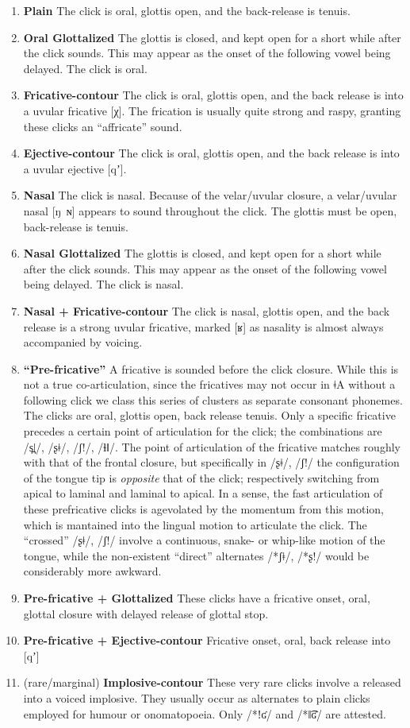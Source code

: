 \documentclass[11pt,a5paper]{book}
\newcommand{\qcn}[1]{\textcolor{AccentText}{\large#1}}
\newcommand{\langname}{\qcn{ǂA}}
\begin{document}
\begin{enumerate}[I]
\item \textbf{Plain} The click is oral, glottis open, and the back-release is tenuis.
\item \textbf{Oral Glottalized} The glottis is closed, and kept open for a short while after the click sounds. This may appear as the onset of the following vowel being delayed. The click is oral.
\item \textbf{Fricative-contour} The click is oral, glottis open, and the back release is into a uvular fricative [χ]. The frication is usually quite strong and raspy, granting these clicks an ``affricate'' sound.
\item \textbf{Ejective-contour} The click is oral, glottis open, and the back release is into a uvular ejective [qʼ].
\item \textbf{Nasal} The click is nasal. Because of the velar/uvular closure, a velar/uvular nasal [ŋ~ɴ] appears to sound throughout the click. The glottis must be open, back-release is tenuis.
\item \textbf{Nasal Glottalized} The glottis is closed, and kept open for a short while after the click sounds. This may appear as the onset of the following vowel being delayed. The click is nasal.
\item \textbf{Nasal + Fricative-contour} The click is nasal, glottis open, and the back release is a strong uvular fricative, marked [ʁ] as nasality is almost always accompanied by voicing.
\item \textbf{``Pre-fricative''} A fricative is sounded before the click closure. While this is not a true co-articulation, since the fricatives may not occur in \langname{} without a following click we class this series of clusters as separate consonant phonemes. The clicks are oral, glottis open, back release tenuis. Only a specific fricative precedes a certain point of articulation for the click; the combinations are /s̪ǀ/, /ʂǂ/, /ʃ!/, /ɬǁ/. The point of articulation of the fricative matches roughly with that of the frontal closure, but specifically in /ʂǂ/, /ʃ!/ the configuration of the tongue tip is \emph{opposite} that of the click; respectively switching from apical to laminal and laminal to apical. In a sense, the fast articulation of these prefricative clicks is agevolated by the momentum from this motion, which is mantained into the lingual motion to articulate the click. The ``crossed'' /ʂǂ/, /ʃ!/ involve a continuous, snake- or whip-like motion of the tongue, while the non-existent ``direct'' alternates /*ʃǂ/, /*ʂ!/ would be considerably more awkward.
\item \textbf{Pre-fricative + Glottalized} These clicks have a fricative onset, oral, glottal closure with delayed release of glottal stop.
\item \textbf{Pre-fricative + Ejective-contour} Fricative onset, oral, back release into [qʼ]
\item (rare/marginal) \textbf{Implosive-contour} These very rare clicks involve a released into a voiced implosive. They usually occur as alternates to plain clicks employed for humour or onomatopoeia. Only /*ǃʛ/ and /*‖͡ʛ/ are attested.
\end{enumerate}
\end{document}
